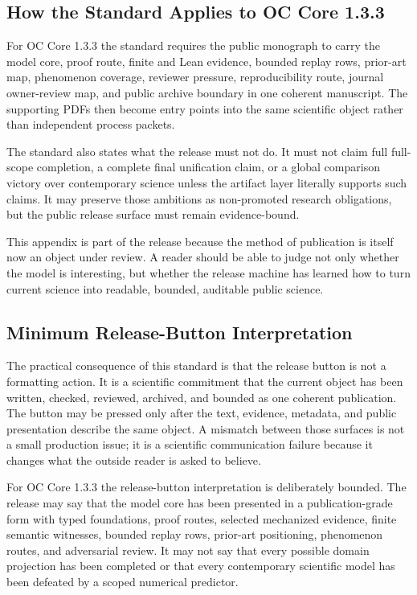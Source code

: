\subsection{How the Standard Applies to OC Core 1.3.3}

For OC Core 1.3.3 the standard requires the public monograph to carry the model core, proof route, finite and Lean evidence, bounded replay rows, prior-art map, phenomenon coverage, reviewer pressure, reproducibility route, journal owner-review map, and public archive boundary in one coherent manuscript. The supporting PDFs then become entry points into the same scientific object rather than independent process packets.


The standard also states what the release must not do. It must not claim full full-scope completion, a complete final unification claim, or a global comparison victory over contemporary science unless the artifact layer literally supports such claims. It may preserve those ambitions as non-promoted research obligations, but the public release surface must remain evidence-bound.


This appendix is part of the release because the method of publication is itself now an object under review. A reader should be able to judge not only whether the model is interesting, but whether the release machine has learned how to turn current science into readable, bounded, auditable public science.


\subsection{Minimum Release-Button Interpretation}

The practical consequence of this standard is that the release button is not a formatting action. It is a scientific commitment that the current object has been written, checked, reviewed, archived, and bounded as one coherent publication. The button may be pressed only after the text, evidence, metadata, and public presentation describe the same object. A mismatch between those surfaces is not a small production issue; it is a scientific communication failure because it changes what the outside reader is asked to believe.


For OC Core 1.3.3 the release-button interpretation is deliberately bounded. The release may say that the model core has been presented in a publication-grade form with typed foundations, proof routes, selected mechanized evidence, finite semantic witnesses, bounded replay rows, prior-art positioning, phenomenon routes, and adversarial review. It may not say that every possible domain projection has been completed or that every contemporary scientific model has been defeated by a scoped numerical predictor.


